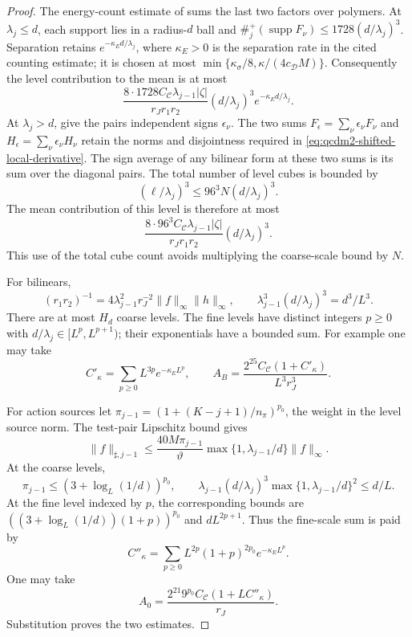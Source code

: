 \documentclass[11pt,letterpaper,reqno]{amsart}
\theoremstyle{definition}
\theoremstyle{remark}
\begin{document}
\begin{proof}
The energy-count estimate of \cite[Prop. 10.16 and its proof]{QCDM1} sums the last two
factors over polymers. At \(\lambda_j\le d\), each support
lies in a radius-\(d\) ball and
\(\#^+_j(\operatorname{supp}F_\nu)\le1728(d/\lambda_j)^3\).
Separation retains \(e^{-\kappa_Ed/\lambda_j}\), where
$\kappa_E>0$ is the separation rate in the cited counting
estimate; it is chosen at most
$\min\{\kappa_\sigma/8,\kappa/(4c_{\mathcal D}M)\}$.
Consequently the level contribution to the mean is at most
\[
 \frac{8\cdot1728C_{\mathscr C}\lambda_{j-1}|\zeta|}
                 {r_Jr_1r_2}
       (d/\lambda_j)^3e^{-\kappa_Ed/\lambda_j}.
\]
At \(\lambda_j>d\), give the pairs independent signs
\(\epsilon_\nu\). The two sums
\(F_\epsilon=\sum_\nu\epsilon_\nu F_\nu\) and
\(H_\epsilon=\sum_\nu\epsilon_\nu H_\nu\) retain the norms
and disjointness required in
\eqref{eq:qcdm2-shifted-local-derivative}.
The sign average of any bilinear form at these two sums is
its sum over the diagonal pairs. The total number of
level cubes is bounded by
\[
 (\ell/\lambda_j)^3
       \le96^3N(d/\lambda_j)^3.
\]
The mean contribution of this level is therefore at most
\[
 \frac{8\cdot96^3C_{\mathscr C}\lambda_{j-1}|\zeta|}
                 {r_Jr_1r_2}(d/\lambda_j)^3.
\]
This use of the total cube count avoids multiplying the
coarse-scale bound by \(N\).

For bilinears,
\[
 (r_1r_2)^{-1}
   =4\lambda_{j-1}^2r_J^{-2}
                       \|f\|_\infty\|h\|_\infty,\qquad
 \lambda_{j-1}^3(d/\lambda_j)^3=d^3/L^3.
\]
There are at most \(H_d\) coarse levels. The fine levels
have distinct integers \(p\ge0\) with
\(d/\lambda_j\in[L^p,L^{p+1})\); their exponentials have a
bounded sum. For example one may take
\[
 C'_\kappa=\sum_{p\ge0}L^{3p}e^{-\kappa_E L^p},\qquad
 A_B=\frac{2^{25}C_{\mathscr C}(1+C'_\kappa)}{L^3r_J^3}.
\]

For action sources let
\(\pi_{j-1}=(1+(K-j+1)/n_\pi)^{p_0}\), the weight
in the level source norm. The test-pair Lipschitz bound gives
\[
 \|f\|_{\sharp,j-1}\le
 \frac{40M\pi_{j-1}}{\vartheta}
       \max\{1,\lambda_{j-1}/d\}\|f\|_\infty.
\]
At the coarse levels,
\[
 \pi_{j-1}\le(3+\log_L(1/d))^{p_0},\qquad
 \lambda_{j-1}(d/\lambda_j)^3
        \max\{1,\lambda_{j-1}/d\}^2\le d/L.
\]
At the fine level indexed by \(p\), the corresponding bounds
are \(((3+\log_L(1/d))(1+p))^{p_0}\) and
\(dL^{2p+1}\). Thus the fine-scale sum is paid by
\[
 C''_\kappa=\sum_{p\ge0}
           L^{2p}(1+p)^{2p_0}e^{-\kappa_E L^p}.
\]
One may take
\[
 A_0=\frac{2^{21}9^{p_0}C_{\mathscr C}
                         (1+LC''_\kappa)}{r_J}.
\]
Substitution proves the two estimates.
\end{proof}
\end{document}
